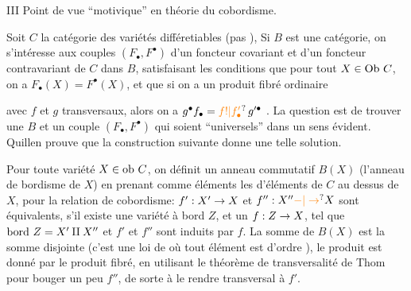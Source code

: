 

III \quad Point de vue ``motivique'' en théorie du cobordisme.

Soit $C$ la catégorie des variétés différetiables  (pas  ),  Si $B$ est une catégorie, on s'intéresse aux couples $(F_{\bullet},F^{\bullet})$ d'un foncteur covariant et d'un foncteur contravariant de $C$ dans $B$, satisfaisant les conditions que pour tout $X\in\mathrm{Ob}\ C$, on a $F_{\bullet}(X)=F^{\bullet}(X)$, et que si on a un produit fibré ordinaire


avec $f$ et $g$ transversaux, alors on a $g^{\bullet}f_{\bullet}=\unsure{f!|f'_{\bullet}}\,g'^{\bullet}$ . La question est de trouver une $B$ et un couple $(F_{\bullet},F^{\bullet})$ qui soient ``universels'' dans un sens évident. Quillen prouve que la construction suivante donne une telle solution.

Pour toute variété $X\in\mathrm{ob}\ C$, on définit un anneau commutatif $B(X)$ (l'anneau de bordisme de $X$) en prenant comme éléments les   d'éléments de $C$ au dessus de $X$, pour la relation de cobordisme: $f':X'\to X$ et $f'':X''\handwritten{\unsure{-|\to}}X$ sont équivalents, s'il existe une variété à bord $Z$, et un $f:Z\to X$, tel que $\mathrm{bord}\ Z=X'\handwritten{\amalg}X''$ et $f'$ et $f''$ sont induits par $f$. La somme de $B(X)$ est la somme disjointe (c'est une loi de   où tout élément est d'ordre  ), le produit est donné par le produit fibré, en utilisant le théorème de transversalité de Thom pour bouger un peu $f''$, de sorte à le rendre transversal à $f'$.

